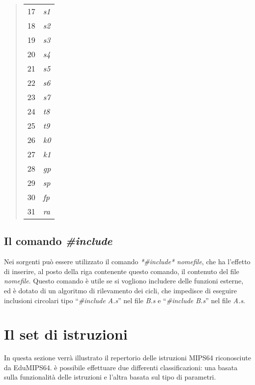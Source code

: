 \documentclass[letterpaper,10pt,english]{sphinxmanual}
\begin{document}
\begin{quote}
\begin{longtable}{|l|l|}
17
 & 
\emph{s1}
\\

18
 & 
\emph{s2}
\\

19
 & 
\emph{s3}
\\

20
 & 
\emph{s4}
\\

21
 & 
\emph{s5}
\\

22
 & 
\emph{s6}
\\

23
 & 
\emph{s7}
\\

24
 & 
\emph{t8}
\\

25
 & 
\emph{t9}
\\

26
 & 
\emph{k0}
\\

27
 & 
\emph{k1}
\\

28
 & 
\emph{gp}
\\

29
 & 
\emph{sp}
\\

30
 & 
\emph{fp}
\\

31
 & 
\emph{ra}
\\
\hline
\end{longtable}

\end{quote}


\section{Il comando \emph{\#include}}
\label{source-files-format:il-comando-include}
Nei sorgenti può essere utilizzato il comando \emph{*\#include* nomefile}, che ha
l'effetto di inserire, al posto della riga contenente questo comando, il
contenuto del file \emph{nomefile}.
Questo comando è utile se si vogliono includere delle funzioni esterne, ed è
dotato di un algoritmo di rilevamento dei cicli, che impedisce di eseguire
inclusioni circolari tipo ``\emph{\#include A.s}'' nel file \emph{B.s} e
``\emph{\#include B.s}'' nel file \emph{A.s}.


\chapter{Il set di istruzioni}
\label{instructions::doc}\label{instructions:il-set-di-istruzioni}
In questa sezione verrà illustrato il repertorio delle istruzioni MIPS64
riconosciute da EduMIPS64. è possibile effettuare due differenti
classificazioni: una basata sulla funzionalità delle istruzioni e l'altra
basata sul tipo di parametri.
\end{document}
